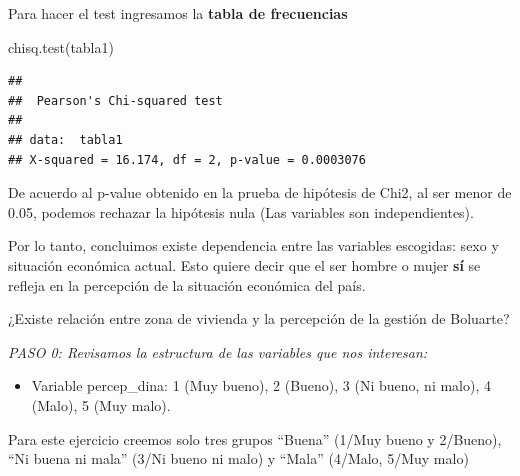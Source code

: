\documentclass[
]{article}
\newenvironment{Shaded}{\begin{snugshade}}{\end{snugshade}}
\newcommand{\AttributeTok}[1]{\textcolor[rgb]{0.77,0.63,0.00}{#1}}
\newcommand{\DecValTok}[1]{\textcolor[rgb]{0.00,0.00,0.81}{#1}}
\newcommand{\FunctionTok}[1]{\textcolor[rgb]{0.00,0.00,0.00}{#1}}
\newcommand{\NormalTok}[1]{#1}
\newcommand{\OtherTok}[1]{\textcolor[rgb]{0.56,0.35,0.01}{#1}}
\newcommand{\SpecialCharTok}[1]{\textcolor[rgb]{0.00,0.00,0.00}{#1}}
\newcommand{\StringTok}[1]{\textcolor[rgb]{0.31,0.60,0.02}{#1}}
\providecommand{\tightlist}{%
  \setlength{\itemsep}{0pt}\setlength{\parskip}{0pt}}
\begin{document}
Para hacer el test ingresamos la \textbf{tabla de frecuencias}

\begin{Shaded}
\begin{Highlighting}[]
\FunctionTok{chisq.test}\NormalTok{(tabla1)}
\end{Highlighting}
\end{Shaded}

\begin{verbatim}
## 
##  Pearson's Chi-squared test
## 
## data:  tabla1
## X-squared = 16.174, df = 2, p-value = 0.0003076
\end{verbatim}

De acuerdo al p-value obtenido en la prueba de hipótesis de Chi2, al ser
menor de 0.05, podemos rechazar la hipótesis nula (Las variables son
independientes).

Por lo tanto, concluimos existe dependencia entre las variables
escogidas: sexo y situación económica actual. Esto quiere decir que el
ser hombre o mujer \textbf{sí} se refleja en la percepción de la
situación económica del país.

¿Existe relación entre zona de vivienda y la percepción de la gestión de
Boluarte?

\emph{PASO 0: Revisamos la estructura de las variables que nos
interesan:}

\begin{itemize}
\tightlist
\item
  Variable percep\_dina: 1 (Muy bueno), 2 (Bueno), 3 (Ni bueno, ni
  malo), 4 (Malo), 5 (Muy malo).
\end{itemize}

Para este ejercicio creemos solo tres grupos ``Buena'' (1/Muy bueno y
2/Bueno), ``Ni buena ni mala'' (3/Ni bueno ni malo) y ``Mala'' (4/Malo,
5/Muy malo)

\begin{Shaded}
\end{Shaded}

\begin{Shaded}
\end{Shaded}
\end{document}
